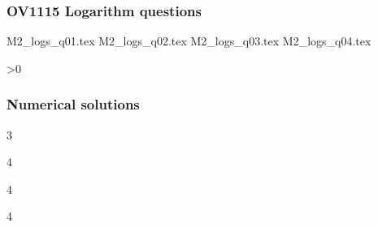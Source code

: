 	\subsubsection{OV1115 Logarithm questions}
\else
\fi
\begin{questions}


{M2_logs_q01.tex}
{M2_logs_q02.tex}
{M2_logs_q03.tex}
{M2_logs_q04.tex}

\ifnum\value{printSols}>0
	\subsubsection*{Numerical solutions}
	\setcounter{solNo}{2}
	\begin{enumerate}
	\end{enumerate}
	\else
\fi

\end{questions}